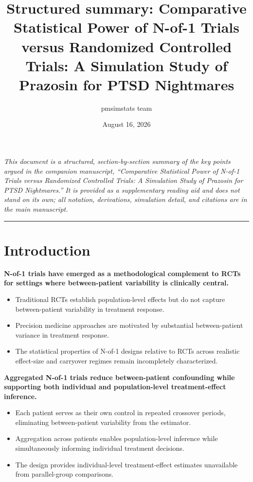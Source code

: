 \documentclass[
  11pt,
]{article}
\title{Structured summary: Comparative Statistical Power of N-of-1 Trials versus Randomized Controlled Trials: A Simulation Study of Prazosin for PTSD Nightmares}
\author{pmsimstats team}
\date{August 16, 2026}
\begin{document}
\maketitle

{
\setcounter{tocdepth}{2}
\tableofcontents
}
\emph{This document is a structured, section-by-section summary of the key points argued in the companion manuscript, ``Comparative Statistical Power of N-of-1 Trials versus Randomized Controlled Trials: A Simulation Study of Prazosin for PTSD Nightmares.'' It is provided as a supplementary reading aid and does not stand on its own; all notation, derivations, simulation detail, and citations are in the main manuscript.}

\bigskip\noindent

\rule{\textwidth}{0.4pt}\bigskip

\section{Introduction}\label{introduction}

\textbf{N-of-1 trials have emerged as a methodological complement to RCTs for settings where between-patient variability is clinically central.}

\begin{itemize}\setlength{\itemsep}{2pt}\setlength{\parskip}{0pt}
\item Traditional RCTs establish population-level effects but do not capture between-patient variability in treatment response.
\item Precision medicine approaches are motivated by substantial between-patient variance in treatment response.
\item The statistical properties of N-of-1 designs relative to RCTs across realistic effect-size and carryover regimes remain incompletely characterized.
\end{itemize}

\textbf{Aggregated N-of-1 trials reduce between-patient confounding while supporting both individual and population-level treatment-effect inference.}

\begin{itemize}\setlength{\itemsep}{2pt}\setlength{\parskip}{0pt}
\item Each patient serves as their own control in repeated crossover periods, eliminating between-patient variability from the estimator.
\item Aggregation across patients enables population-level inference while simultaneously informing individual treatment decisions.
\item The design provides individual-level treatment-effect estimates unavailable from parallel-group comparisons.
\end{itemize}
\end{document}
